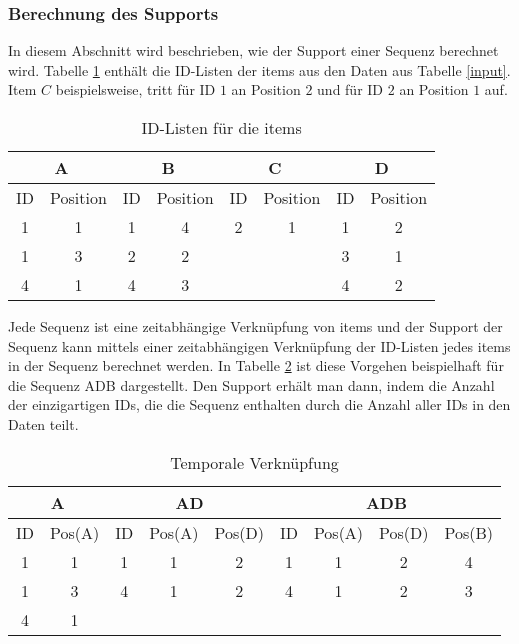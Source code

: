 \subsubsection{Berechnung des Supports}
In diesem Abschnitt wird beschrieben, wie der Support einer Sequenz berechnet wird. Tabelle \ref{idlist} enthält die ID-Listen der items aus den Daten aus Tabelle \ref{input}. Item $C$ beispielsweise, tritt für ID $1$ an Position $2$ und für ID $2$ an Position $1$ auf.
\begin{table}[hbt]\label{idlist}
\centering
\begin{tabular}{c|c|c|c|c|c|c|c}
\multicolumn{2}{c|}{A} & \multicolumn{2}{c|}{B} & \multicolumn{2}{c|}{C} & \multicolumn{2}{c}{D} \\ \hline
ID & Position  & ID & Position  & ID & Position  & ID & Position  \\ \hline
1	 & 1				 & 1  & 4				  & 2  & 1				 & 1  & 2 \\
1  & 3				 & 2  &	2			    &    &  				 & 3  & 1 \\
4  & 1				 & 4  &	3			    &    &  				 & 4  & 2 
\end{tabular}
\caption{ID-Listen für die items}
\end{table}
Jede Sequenz ist eine zeitabhängige Verknüpfung von items und der Support der Sequenz kann mittels einer zeitabhängigen Verknüpfung der ID-Listen jedes items in der Sequenz berechnet werden. In Tabelle \ref{tempjoin} ist diese Vorgehen beispielhaft für die Sequenz ADB dargestellt. Den Support erhält man dann, indem die Anzahl der einzigartigen IDs, die die Sequenz enthalten durch die Anzahl aller IDs in den Daten teilt.
\begin{table}[hbt]\label{tempjoin}
\centering
\begin{tabular}{c|c||c|c|c||c|c|c|c}
\multicolumn{2}{c||}{A} & \multicolumn{3}{c||}{AD} & \multicolumn{4}{c}{ADB} \\ \hline \hline
ID & Pos(A) 	    		  & ID & Pos(A) & Pos(D) 		 & ID & Pos(A) & Pos(D) & Pos(B) \\ \hline
1  & 1									& 1  & 1			& 2          & 1  & 1			 & 2      & 4 \\
1  & 3									& 4  & 1      & 2          & 4  & 1      & 2      & 3 \\
4  & 1									& 	 & 				&            & 	  & 			 &        &	
\end{tabular}
\caption{Temporale Verknüpfung}
\end{table}